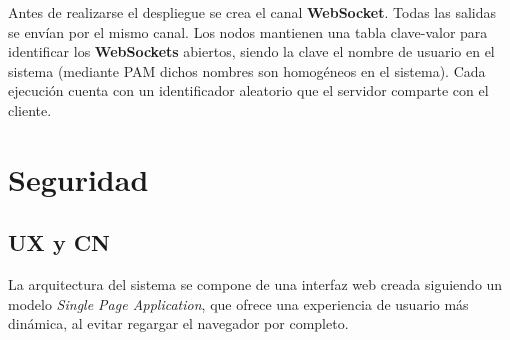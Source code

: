 \documentclass{article}
\begin{document}
Antes de realizarse el despliegue se crea el canal \textbf{WebSocket}. Todas las salidas se envían por el mismo canal. Los nodos mantienen una tabla clave-valor para identificar los \textbf{WebSockets} abiertos, siendo la clave el nombre de usuario en el sistema (mediante PAM dichos nombres son homogéneos en el sistema). Cada ejecución cuenta con un identificador aleatorio que el servidor comparte con el cliente.


\section{Seguridad}
\label{seguridad}

\subsection{UX y CN}

La arquitectura del sistema se compone de una interfaz web creada siguiendo un modelo \textit{Single Page Application}, que ofrece una experiencia de usuario más dinámica, al evitar regargar el navegador por completo. %





\end{document}
